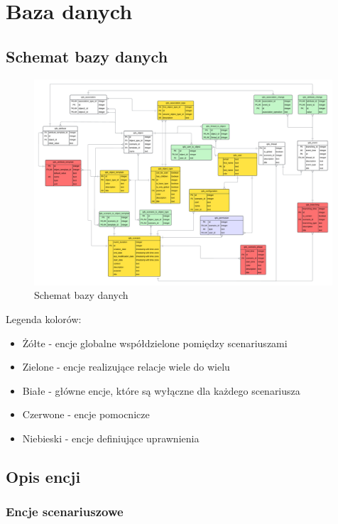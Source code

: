 \chapter{Baza danych}

\section{Schemat bazy danych}

\begin{figure}[h!] 
\centering
\includegraphics[width=0.99\textwidth]{resources/local/baza-danych-schemat.png}
\caption{Schemat bazy danych} 
\end{figure}

Legenda kolorów:
\begin{itemize}
    \item Żółte - encje globalne współdzielone pomiędzy scenariuszami
    \item Zielone - encje realizujące relacje wiele do wielu
    \item Białe - główne encje, które są wyłączne dla każdego scenariusza
    \item Czerwone - encje pomocnicze 
    \item Niebieski - encje definiujące uprawnienia
\end{itemize}

\section{Opis encji}

\subsection{Encje scenariuszowe}

